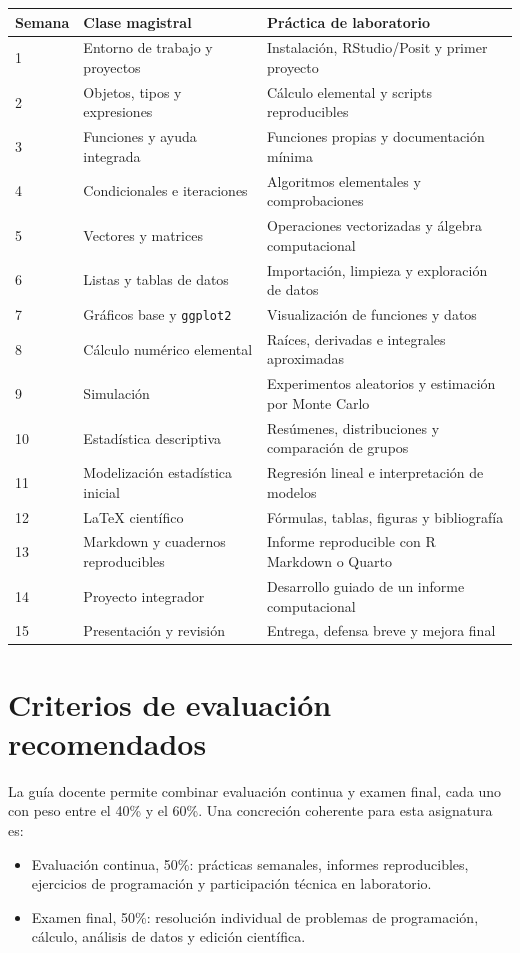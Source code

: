 \documentclass[11pt,a4paper,oneside]{book}
\begin{document}
\begin{longtable}{p{}p{}p{}}
\toprule
Semana & Clase magistral & Práctica de laboratorio \\
\midrule
1 & Entorno de trabajo y proyectos & Instalación, RStudio/Posit y primer proyecto \\
2 & Objetos, tipos y expresiones & Cálculo elemental y scripts reproducibles \\
3 & Funciones y ayuda integrada & Funciones propias y documentación mínima \\
4 & Condicionales e iteraciones & Algoritmos elementales y comprobaciones \\
5 & Vectores y matrices & Operaciones vectorizadas y álgebra computacional \\
6 & Listas y tablas de datos & Importación, limpieza y exploración de datos \\
7 & Gráficos base y \texttt{ggplot2} & Visualización de funciones y datos \\
8 & Cálculo numérico elemental & Raíces, derivadas e integrales aproximadas \\
9 & Simulación & Experimentos aleatorios y estimación por Monte Carlo \\
10 & Estadística descriptiva & Resúmenes, distribuciones y comparación de grupos \\
11 & Modelización estadística inicial & Regresión lineal e interpretación de modelos \\
12 & LaTeX científico & Fórmulas, tablas, figuras y bibliografía \\
13 & Markdown y cuadernos reproducibles & Informe reproducible con R Markdown o Quarto \\
14 & Proyecto integrador & Desarrollo guiado de un informe computacional \\
15 & Presentación y revisión & Entrega, defensa breve y mejora final \\
\bottomrule
\end{longtable}

\section{Criterios de evaluación recomendados}
La guía docente permite combinar evaluación continua y examen final, cada uno con peso entre el 40\% y el 60\%. Una concreción coherente para esta asignatura es:

\begin{itemize}
  \item Evaluación continua, 50\%: prácticas semanales, informes reproducibles, ejercicios de programación y participación técnica en laboratorio.
  \item Examen final, 50\%: resolución individual de problemas de programación, cálculo, análisis de datos y edición científica.
\end{itemize}
\end{document}
